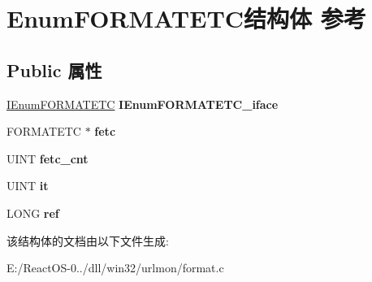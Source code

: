 \hypertarget{struct_enum_f_o_r_m_a_t_e_t_c}{}\section{Enum\+F\+O\+R\+M\+A\+T\+E\+T\+C结构体 参考}
\label{struct_enum_f_o_r_m_a_t_e_t_c}
\subsection*{Public 属性}
\begin{DoxyCompactItemize}
\item 
\mbox{\label{struct_enum_f_o_r_m_a_t_e_t_c_a490e6280cd043abb4ab4a4bf821f79a9}} 
\hyperlink{interface_i_enum_f_o_r_m_a_t_e_t_c}{I\+Enum\+F\+O\+R\+M\+A\+T\+E\+TC} {\bfseries I\+Enum\+F\+O\+R\+M\+A\+T\+E\+T\+C\+\_\+iface}
\item 
\mbox{\label{struct_enum_f_o_r_m_a_t_e_t_c_a0663803fb125ca0e7521a9bf238a4d2d}} 
F\+O\+R\+M\+A\+T\+E\+TC $\ast$ {\bfseries fetc}
\item 
\mbox{\label{struct_enum_f_o_r_m_a_t_e_t_c_af06b2c48411dbe82d92009b6cce42696}} 
U\+I\+NT {\bfseries fetc\+\_\+cnt}
\item 
\mbox{\label{struct_enum_f_o_r_m_a_t_e_t_c_a652dfd288dbbb6b57fc70f02af07b0a5}} 
U\+I\+NT {\bfseries it}
\item 
\mbox{\label{struct_enum_f_o_r_m_a_t_e_t_c_a2c13e0539f5f4cb2f8025736933f9ebc}} 
L\+O\+NG {\bfseries ref}
\end{DoxyCompactItemize}


该结构体的文档由以下文件生成\+:\begin{DoxyCompactItemize}
\item 
E\+:/\+React\+O\+S-\/0../dll/win32/urlmon/format.\+c\end{DoxyCompactItemize}

